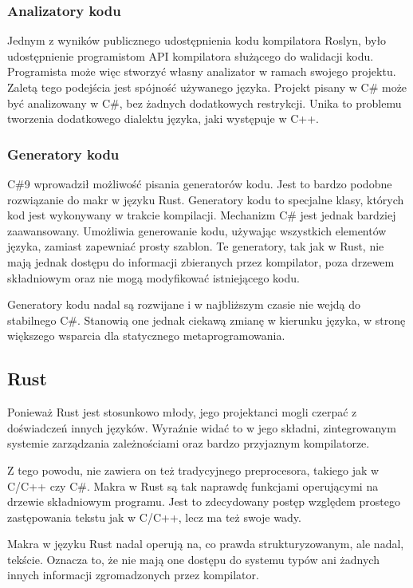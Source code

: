 \subsubsection{Analizatory kodu}

Jednym z wyników publicznego udostępnienia kodu kompilatora Roslyn, było udostępnienie programistom API kompilatora służącego do walidacji kodu.
Programista może więc stworzyć własny analizator w ramach swojego projektu.
Zaletą tego podejścia  jest spójność używanego języka.
Projekt pisany w C\# może być analizowany w C\#, bez żadnych dodatkowych restrykcji.
Unika to problemu tworzenia dodatkowego dialektu języka, jaki występuje w C++.

\subsubsection{Generatory kodu}

C\#9 wprowadził możliwość pisania generatorów kodu. Jest to bardzo podobne rozwiązanie do makr w języku Rust. Generatory kodu to specjalne klasy, których kod jest wykonywany w trakcie kompilacji. 
Mechanizm C\# jest jednak bardziej zaawansowany.
Umożliwia generowanie kodu, używając wszystkich elementów języka, zamiast zapewniać prosty szablon.
Te generatory, tak jak w Rust, nie mają jednak dostępu do informacji zbieranych przez kompilator, poza drzewem składniowym oraz nie mogą modyfikować istniejącego kodu.

Generatory kodu nadal są rozwijane i w najbliższym czasie nie wejdą do stabilnego C\#. Stanowią one jednak ciekawą zmianę w kierunku języka, w stronę większego wsparcia dla statycznego metaprogramowania.

\subsection {Rust}
Ponieważ Rust jest stosunkowo młody, jego projektanci mogli czerpać z doświadczeń innych języków. Wyraźnie widać to w jego składni, zintegrowanym systemie zarządzania zależnościami oraz bardzo przyjaznym kompilatorze.\par
Z tego powodu, nie zawiera on też tradycyjnego preprocesora, takiego jak w C/C++ czy C\#. Makra w Rust są tak naprawdę funkcjami operującymi na drzewie składniowym programu. Jest to zdecydowany postęp względem prostego zastępowania tekstu jak w C/C++, lecz ma też swoje wady.\par
Makra w języku Rust nadal operują na, co prawda strukturyzowanym, ale nadal, tekście. Oznacza to, że nie mają one dostępu do systemu typów ani żadnych innych informacji zgromadzonych przez kompilator.\par

